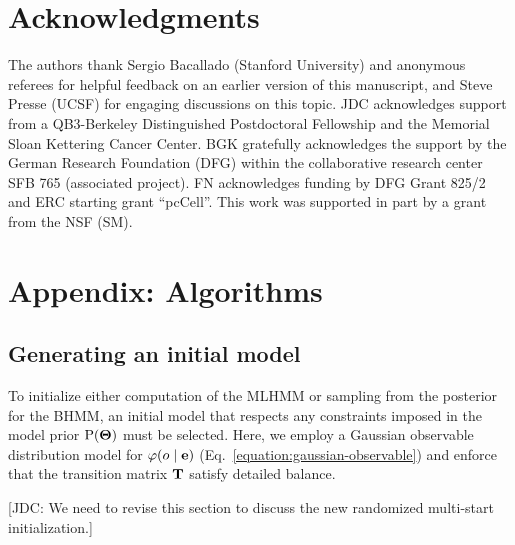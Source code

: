 \documentclass[aps,pre,twocolumn,superscriptaddress,nofootinbib,longbibliography]{revtex4-1}
\newcommand{\bfm}[1]{{\bf #1}}
\renewcommand{\Pr}{\mathrm{P}}
\begin{document}
{\section{Acknowledgments}
The authors thank Sergio Bacallado (Stanford University) {\color{red}and anonymous referees} for helpful feedback on an earlier version of this manuscript, and Steve Presse (UCSF) for engaging discussions on this topic.
\color{red}
JDC acknowledges support from a QB3-Berkeley Distinguished Postdoctoral Fellowship and the Memorial Sloan Kettering Cancer Center.
BGK gratefully acknowledges the support by the German Research Foundation (DFG) within the collaborative research center SFB 765 (associated project).
\color{black}
FN acknowledges funding by DFG Grant 825/2 and ERC starting grant ``pcCell''.
This work was supported in part by a grant from the NSF (SM).





\section{Appendix: Algorithms}
\label{section:algorithms}

\subsection{Generating an initial model}

To initialize either computation of the MLHMM or sampling from the posterior for the BHMM, an initial model that respects any constraints imposed in the model prior $\Pr(\bfm{\Theta})$ must be selected.
Here, we employ a Gaussian observable distribution model for $\varphi(o \mid \bfm{e})$ (Eq.~\ref{equation:gaussian-observable}) and enforce that the transition matrix $\bfm{T}$ satisfy detailed balance.

{\color{blue}[JDC: We need to revise this section to discuss the new randomized multi-start initialization.]}

}
\end{document}
